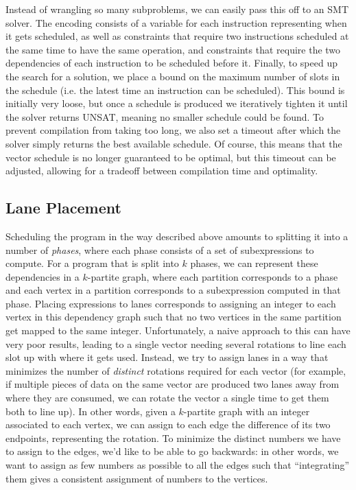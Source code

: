 Instead of wrangling so many subproblems, we can easily pass this off to an SMT solver.
The encoding consists of a variable for each instruction representing when it gets scheduled, as well as constraints that require two instructions scheduled at the same time to have the same operation, and constraints that require the two dependencies of each instruction to be scheduled before it.
Finally, to speed up the search for a solution, we place a bound on the maximum number of slots in the schedule (i.e. the latest time an instruction can be scheduled).
This bound is initially very loose, but once a schedule is produced we iteratively tighten it until the solver returns UNSAT, meaning no smaller schedule could be found. 
To prevent compilation from taking too long, we also set a timeout after which the solver simply returns the best available schedule.
Of course, this means that the vector schedule is no longer guaranteed to be optimal, but this timeout can be adjusted, allowing for a tradeoff between compilation time and optimality.

\subsection{Lane Placement} 
Scheduling the program in the way described above amounts to splitting it into a number of {\em phases}, where each phase consists of a set of subexpressions to compute.
For a program that is split into $k$ phases, we can represent these dependencies in a $k$-partite graph, where each partition corresponds to a phase and each vertex in a partition corresponds to a subexpression computed in that phase.
Placing expressions to lanes corresponds to assigning an integer to each vertex in this dependency graph such that no two vertices in the same partition get mapped to the same integer.
Unfortunately, a naive approach to this can have very poor results, leading to a single vector needing several rotations to line each slot up with where it gets used.
Instead, we try to assign lanes in a way that minimizes the number of {\em distinct} rotations required for each vector (for example, if multiple pieces of data on the same vector are produced two lanes away from where they are consumed, we can rotate the vector a single time to get them both to line up).
In other words, given a $k$-partite graph with an integer associated to each vertex, we can assign to each edge the difference of its two endpoints, representing the rotation. 
To minimize the distinct numbers we have to assign to the edges, we'd like to be able to go backwards: in other words, we want to assign as few numbers as possible to all the edges such that ``integrating'' them gives a consistent assignment of numbers to the vertices.

